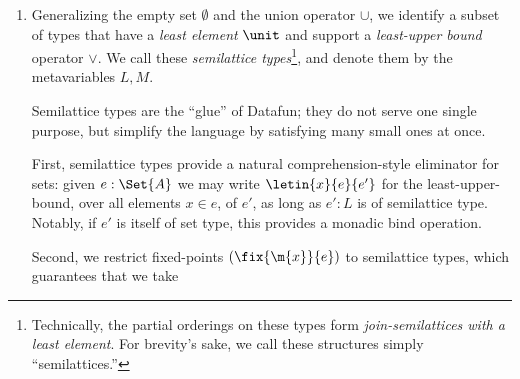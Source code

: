 \documentclass[preprint]{sigplanconf}
\begin{document}
\begin{enumerate}
\item\label{item:semilattice-types} Generalizing the empty set $\emptyset$ and
  the union operator $\cup$, we identify a subset of types that have a
  \emph{least element} $\unit$ and support a \emph{least-upper bound} operator
  $\vee$. We call these \emph{semilattice types}\footnote{Technically, the
    partial orderings on these types form \emph{join-semilattices with a least
      element}. For brevity's sake, we call these structures simply
    ``semilattices.''}, and denote them by the metavariables $L,M$.

  Semilattice types are the ``glue'' of Datafun; they do not serve one single
  purpose, but simplify the language by satisfying many small ones at once.

  First, semilattice types provide a natural comprehension-style eliminator for
  sets: given $e : \Set{A}$ we may write $\letin{x}{e}{e'}$ for the
  least-upper-bound, over all elements $x \in e$, of $e'$, as long as $e' : L$
  is of semilattice type. Notably, if $e'$ is itself of set type, this provides
  a monadic bind operation. 

  Second, we restrict fixed-points $(\fix{\m{x}}{e})$ to semilattice types,
  which guarantees that we take



\end{enumerate}
\end{document}
